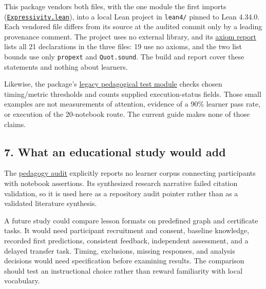 \documentclass[
  11pt,
]{article}
\newcommand{\passthrough}[1]{#1}
\begin{document}
This package vendors both files, with the one module the first imports
(\href{https://github.com/dbccpage/the_symbol_game/blob/52cb5457f6c485ba548cfd292f6012a941ed22cf/omega_engine_atlas/coda_atlas/omega_engine_symbol_game/007_pfp_executable_lessons_and_evidence_boundaries/lean4/Expressivity.lean}{\mbox{\nolinkurl{Expressivity.lean}}}),
into a local Lean project in \passthrough{\lstinline!lean4/!} pinned to
Lean 4.34.0. Each vendored file differs from its source at the audited
commit only by a leading provenance comment. The project uses no
external library, and its
\href{https://github.com/dbccpage/the_symbol_game/blob/52cb5457f6c485ba548cfd292f6012a941ed22cf/omega_engine_atlas/coda_atlas/omega_engine_symbol_game/007_pfp_executable_lessons_and_evidence_boundaries/lean4/axiom_report.txt}{axiom
report} lists all 21 declarations in the three files: 19 use no axioms,
and the two list bounds use only \passthrough{\lstinline!propext!} and
\passthrough{\lstinline!Quot.sound!}. The build and report cover these
statements and nothing about learners.

Likewise, the package's
\href{https://github.com/dbccpage/the_symbol_game/blob/52cb5457f6c485ba548cfd292f6012a941ed22cf/omega_engine_atlas/coda_atlas/omega_engine_symbol_game/007_pfp_executable_lessons_and_evidence_boundaries/code/tests/test_007_pedagogical_transmission.py}{legacy
pedagogical test module} checks chosen timing/metric thresholds and
counts supplied execution-status fields. Those small examples are not
measurements of attention, evidence of a 90\% learner pass rate, or
execution of the 20-notebook route. The current guide makes none of
those claims.

\subsection{7. What an educational study would
add}\label{what-an-educational-study-would-add}

The
\href{https://github.com/dbccpage/the_symbol_game/blob/52cb5457f6c485ba548cfd292f6012a941ed22cf/omega_engine_education/pedagogy/teaching_and_learning_findings.md}{pedagogy
audit} explicitly reports no learner corpus connecting participants with
notebook assertions. Its synthesized research narrative failed citation
validation, so it is used here as a repository audit pointer rather than
as a validated literature synthesis.

A future study could compare lesson formats on predefined graph and
certificate tasks. It would need participant recruitment and consent,
baseline knowledge, recorded first predictions, consistent feedback,
independent assessment, and a delayed transfer task. Timing, exclusions,
missing responses, and analysis decisions would need specification
before examining results. The comparison should test an instructional
choice rather than reward familiarity with local vocabulary.
\end{document}
